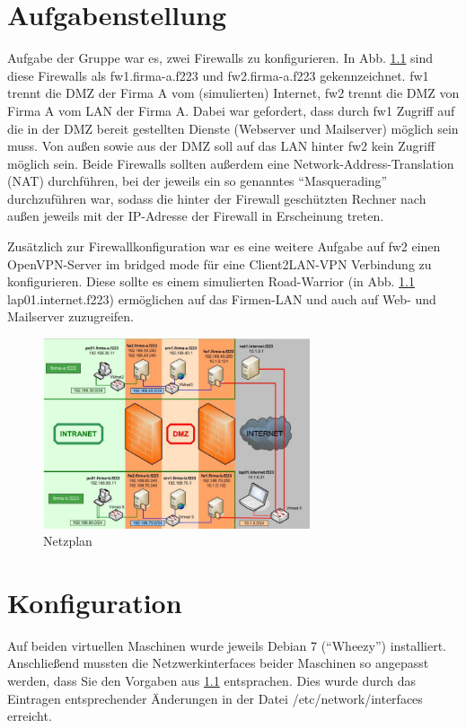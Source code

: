 \chapter{Aufgabenstellung}
Aufgabe der Gruppe war es, zwei Firewalls zu konfigurieren. In Abb. \ref{fig:netzplan} sind diese Firewalls als fw1.firma-a.f223 und fw2.firma-a.f223 gekennzeichnet. fw1 trennt die DMZ der Firma A vom (simulierten) Internet, fw2 trennt die DMZ von Firma A vom LAN der Firma A. Dabei war gefordert, dass durch fw1 Zugriff auf die in der DMZ bereit gestellten Dienste (Webserver und Mailserver) möglich sein muss. Von außen sowie aus der DMZ soll auf das LAN hinter fw2 kein Zugriff möglich sein. Beide Firewalls sollten außerdem eine Network-Address-Translation (NAT) durchführen, bei der jeweils ein so genanntes "`Masquerading"' durchzuführen war, sodass die hinter der Firewall geschützten Rechner nach außen jeweils mit der IP-Adresse der Firewall in Erscheinung treten.

Zusätzlich zur Firewallkonfiguration war es eine weitere Aufgabe auf fw2 einen OpenVPN-Server im bridged mode für eine Client2LAN-VPN Verbindung zu konfigurieren. Diese sollte es einem simulierten Road-Warrior (in Abb. \ref{fig:netzplan} lap01.internet.f223) ermöglichen auf das Firmen-LAN und auch auf Web- und Mailserver zuzugreifen.

\begin{figure}[h!]
	\centering
		\includegraphics[width=0.7\textwidth]{figures/netzplan.PNG}
	\caption{Netzplan \cite{Neuschwander2014}}
	\label{fig:netzplan}
\end{figure}

\chapter{Konfiguration}
Auf beiden virtuellen Maschinen wurde jeweils Debian 7 ("`Wheezy"') installiert. Anschließend mussten die Netzwerkinterfaces beider Maschinen so angepasst werden, dass Sie den Vorgaben aus \ref{fig:netzplan} entsprachen. Dies wurde durch das Eintragen entsprechender Änderungen in der Datei /etc/network/interfaces erreicht.

